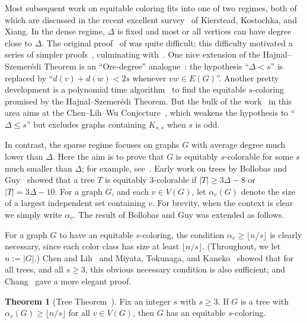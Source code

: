 \documentclass[11pt]{article}
\theoremstyle{definition}
\newtheorem{thmA}{Theorem}
\newcommand\floor[1]{\lfloor#1\rfloor}
\renewcommand\ge\geqslant
\renewcommand\le\leqslant
\begin{document}
Most subsequent work on equitable coloring fits into one of two regimes, both of which are discussed in the recent excellent survey~\cite{KKX-survey}
of Kierstead, Kostochka, and Xiang.  In the dense regime, $\Delta$ is fixed and most or all vertices can have 
degree close to $\Delta$.  The original proof~\cite{HS} of  was quite difficult; this difficulty motivated a series of 
simpler proofs~\cite{KK-short, MS, KKMS}, culminating with~\cite[Theorem~2]{KKX-survey}.  One nice extension of the Hajnal--Szemer\'{e}di Theorem is 
an ``Ore-degree'' analogue~\cite{KK-ore-type2}: the hypothesis ``$\Delta < s$'' is replaced by ``$d(v)+d(w)<2s$ whenever $vw\in E(G)$''.  
Another pretty development is a polynomial time algorithm~\cite{KKMS} 
to find the equitable $s$-coloring promised by the Hajnal--Szemer\'{e}di Theorem.  But the bulk of the work~\cite{CM, KK-ore-type, KK-4, KK-refinement, KKY, LW, nakprasit, YZ} in this area aims at the Chen--Lih--Wu
Conjecture~\cite{CLW}, which weakens the hypothesis to ``$\Delta\le s$'' but excludes graphs containing $K_{s,s}$ when $s$ is odd.

In contrast, the sparse regime focuses on graphs $G$ with average degree much lower than $\Delta$.  Here the aim is to prove that $G$ is equitably 
$s$-colorable for some $s$ much smaller than $\Delta$;
 for example, see~\cite{LSSY, WW}.  Early work on trees by Bollobas and Guy~\cite{bollobas-guy} showed that a 
tree $T$ is equitably $3$-colorable if $|T|\ge 3\Delta-8$ or $|T|=3\Delta-10$.  
For a graph $G$, and each $v\in V(G)$, let $\alpha_v(G)$ denote the size of a largest independent set containing $v$.  
For brevity, when the context is clear we simply write $\alpha_v$.  The result of Bollobas and Guy was extended as follows.

For a graph $G$ to have an equitable $s$-coloring, the condition $\alpha_v \ge \floor{n/s}$ is clearly necessary, 
since each color class has size at least $\floor{n/s}$.  (Throughout, we let $n:=|G|$.)
Chen and Lih~\cite{CL} and Miyata, Tokunaga, and Kaneko~\cite{MTK} showed that for all trees, and all $s\ge 3$, 
this obvious necessary condition is also sufficient; and Chang~\cite{chang} gave a more elegant proof.  

\begin{thmA}[Tree Theorem~\cite{chang,CL,MTK}]
    Fix an integer $s$ with $s\ge 3$.  If $G$ is a tree
    with $\alpha_v(G)\ge \floor{n/s}$ for all $v\in V(G)$, then $G$ has an equitable $s$-coloring.
\end{thmA}
\end{document}
